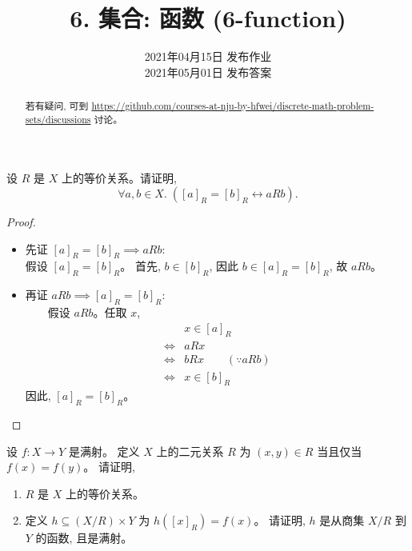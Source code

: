 \documentclass[a4paper, justified]{tufte-handout}
\title{6. 集合: 函数 (6-function)}
\date{2021年04月15日 发布作业 \\ 2021年05月01日 发布答案}
\begin{document}
\maketitle
\noplagiarism %
\begin{abstract}
  若有疑问, 可到 \url{https://github.com/courses-at-nju-by-hfwei/discrete-math-problem-sets/discussions}
  讨论。
\end{abstract}
\beginrequired

\begin{problem}
  设 $R$ 是 $X$ 上的等价关系。请证明,
  \[
    \forall a, b \in X.\; ([a]_{R} = [b]_{R} \leftrightarrow a R b).
  \]
\end{problem}

\begin{proof}
  \begin{itemize}
    \item 先证 $[a]_{R} = [b]_{R} \implies a R b$: \\
      假设 $[a]_{R} = [b]_{R}$。
      首先, $b \in [b]_{R}$, 因此 $b \in [a]_{R} = [b]_{R}$, 故 $a R b$。
    \item 再证 $a R b \implies [a]_{R} = [b]_{R}$: \\
  　　假设 $a R b$。任取 $x$,
      \setcounter{equation}{0}
      \begin{align}
        & x \in [a]_{R} \\[6pt]
        \iff & a R x \\[6pt]
        \iff & b R x \qquad (\because a R b) \\[6pt]
        \iff & x \in [b]_{R}
      \end{align}
      因此, $[a]_{R} = [b]_{R}$。
  \end{itemize}
\end{proof}

\begin{problem}[函数与等价关系 \score{7 = 3 + 4} $\star\star\star$]
  设 $f: X \to Y$ 是满射。
  定义 $X$ 上的二元关系 $R$ 为 $(x, y) \in R$ 当且仅当 $f(x) = f(y)$。
  请证明,
  \begin{enumerate}[(1)]
    \item $R$ 是 $X$ 上的等价关系。
    \item 定义 $h \subseteq (X/R) \times Y$ 为 $h([x]_{R}) = f(x)$。
      请证明, $h$ 是从商集 $X/R$ 到 $Y$ 的函数, 且是满射。
  \end{enumerate}
\end{problem}
\end{document}
